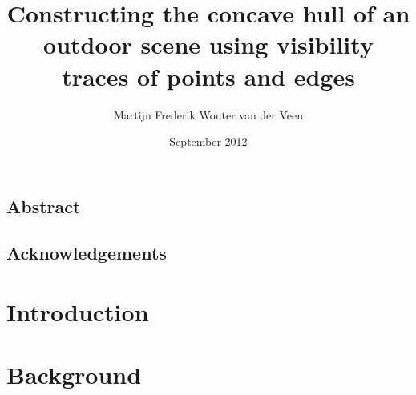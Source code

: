 \documentclass{ucl_thesis}
\title{Constructing the concave hull of an outdoor scene
       using visibility traces of points and edges}
\author{Martijn Frederik Wouter van der Veen}
\date{September 2012}
\begin{document}

\maketitle
{}
\setcounter{page}{1}
\pagestyle{plain}





\newpage
\section*{Abstract}
%


\newpage
\section*{Acknowledgements}

\tableofcontents
\listoffigures
\listofalgorithms
\newpage

%

\setcounter{page}{1}
\pagestyle{plain}




\chapter{Introduction}
\label{introduction}
%



\chapter{Background}
\label{background}
%
\end{document}
